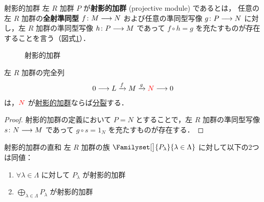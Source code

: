 \documentclass[geometry_main]{subfiles}
\begin{document}

\begin{mydef}[label=def:proj-mod]{射影的加群}
    左 $R$ 加群 $P$ が\textbf{射影的加群} (projective module) であるとは，
    任意の左 $R$ 加群の\textbf{全射準同型} $f\colon M \longrightarrow N$ および任意の準同型写像 $g \colon P \longrightarrow N$ に対し，左 $R$ 加群の準同型写像 $ h \colon P \longrightarrow M$ であって $f \circ h = g$ を充たすものが存在することを言う（図式\ref{fig:proj-mod}）．
\end{mydef}

\begin{figure}[H]
    \centering
    \caption{射影的加群}
    \label{fig:proj-mod}
\end{figure}%

\begin{myprop}[label=prop:proj-mod-split]{}
    左 $R$ 加群の完全列
    \begin{align}
        0 \longrightarrow L \xrightarrow{f} M \xrightarrow{g} \textcolor{red}{N} \longrightarrow 0
    \end{align}
    は，$\textcolor{red}{N}$ が\hyperref[def:proj-mod]{射影的加群}ならば\hyperref[def:split]{分裂}する．
\end{myprop}

\begin{proof}
    射影的加群の定義において $P = N$ とすることで，左 $R$ 加群の準同型写像 $s \colon N \longrightarrow M$ であって $g \circ s = 1_N$ を充たすものが存在する．
\end{proof}

\begin{myprop}[label=prop:proj-mod-dp]{射影的加群の直和}
    左 $R$ 加群の族 $\Familyset[\big]{P_\lambda}{\lambda \in \Lambda}$ に対して以下の2つは同値：
    \begin{enumerate}
        \item $\forall \lambda \in \Lambda$ に対して $P_\lambda$ が射影的加群
        \item $\displaystyle\bigoplus_{\lambda \in \Lambda} P_\lambda$ が射影的加群
    \end{enumerate}
\end{myprop}
\end{document}
